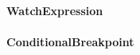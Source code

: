 \documentclass[parskip=full]{scrartcl}
\begin{document}
\paragraph{WatchExpression}
\paragraph{ConditionalBreakpoint}
\end{document}
